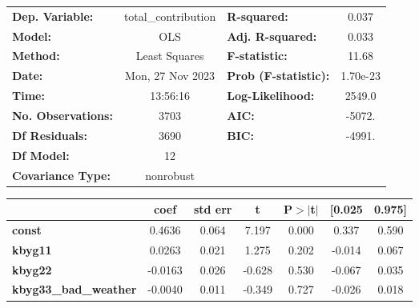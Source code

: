 \begin{center}
\begin{tabular}{lclc}
\toprule
\textbf{Dep. Variable:}                      & total\_contribution & \textbf{  R-squared:         } &     0.037   \\
\textbf{Model:}                              &         OLS         & \textbf{  Adj. R-squared:    } &     0.033   \\
\textbf{Method:}                             &    Least Squares    & \textbf{  F-statistic:       } &     11.68   \\
\textbf{Date:}                               &   Mon, 27 Nov 2023  & \textbf{  Prob (F-statistic):} &  1.70e-23   \\
\textbf{Time:}                               &       13:56:16      & \textbf{  Log-Likelihood:    } &    2549.0   \\
\textbf{No. Observations:}                   &          3703       & \textbf{  AIC:               } &    -5072.   \\
\textbf{Df Residuals:}                       &          3690       & \textbf{  BIC:               } &    -4991.   \\
\textbf{Df Model:}                           &            12       & \textbf{                     } &             \\
\textbf{Covariance Type:}                    &      nonrobust      & \textbf{                     } &             \\
\bottomrule
\end{tabular}
\begin{tabular}{lcccccc}
                                             & \textbf{coef} & \textbf{std err} & \textbf{t} & \textbf{P$> |$t$|$} & \textbf{[0.025} & \textbf{0.975]}  \\
\midrule
\textbf{const}                               &       0.4636  &        0.064     &     7.197  &         0.000        &        0.337    &        0.590     \\
\textbf{kbyg11}                              &       0.0263  &        0.021     &     1.275  &         0.202        &       -0.014    &        0.067     \\
\textbf{kbyg22}                              &      -0.0163  &        0.026     &    -0.628  &         0.530        &       -0.067    &        0.035     \\
\textbf{kbyg33\_bad\_weather}                &      -0.0040  &        0.011     &    -0.349  &         0.727        &       -0.026    &        0.018     \\

\end{tabular}
\end{center}
